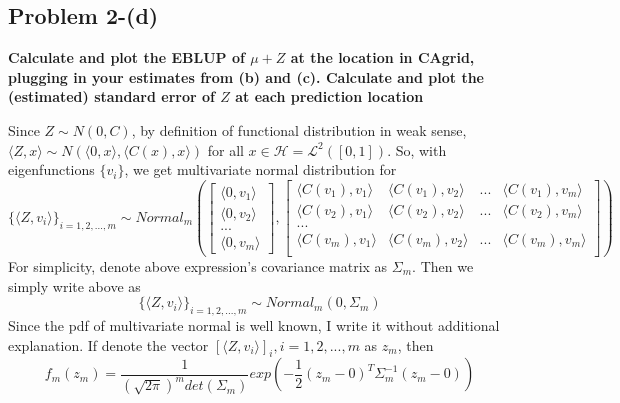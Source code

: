 \documentclass{article}
\begin{document}
\subsection{Problem 2-(d)}
\textbf{
Calculate and plot the EBLUP of $\mu+Z$ at the location in CAgrid,
plugging in your estimates from (b) and (c).
Calculate and plot the (estimated) standard error of $Z$ at each prediction location
}


Since $Z \sim N(0, C)$, by definition of functional distribution in weak sense,
\(\langle Z, x\rangle \sim N(\langle 0,x \rangle, \langle C(x),x\rangle)\) for all $x\in \mathcal{H}=\mathcal{L}^2([0,1])$.
So, with eigenfunctions $\{v_i\}$, we get multivariate normal distribution for
\[\{\langle Z, v_i\rangle\}_{i=1,2,...,m} \sim Normal_m(
\begin{bmatrix}
    \langle 0,v_1 \rangle \\
    \langle 0,v_2 \rangle \\
    ... \\
    \langle 0,v_m \rangle
\end{bmatrix}
,
\begin{bmatrix}
    \langle C(v_1),v_1 \rangle & \langle C(v_1),v_2 \rangle & ... & \langle C(v_1),v_m \rangle \\
    \langle C(v_2),v_1 \rangle & \langle C(v_2),v_2 \rangle & ... & \langle C(v_2),v_m \rangle \\
    ... \\
    \langle C(v_m),v_1 \rangle & \langle C(v_m),v_2 \rangle & ... & \langle C(v_m),v_m \rangle \\
\end{bmatrix}
)\]
For simplicity, denote above expression's covariance matrix as $\Sigma_m$. Then we simply write above as
\[\{\langle Z, v_i\rangle\}_{i=1,2,...,m} \sim Normal_m(0,\Sigma_m)\]
Since the pdf of multivariate normal is well known, I write it without additional explanation.
If denote the vector \([\langle Z, v_i\rangle]_i, i=1,2,...,m\) as $z_m$, then
\[
    f_m(z_m) = \frac{1}{(\sqrt{2\pi})^m det(\Sigma_m)}exp{(-\frac{1}{2}(z_m-0)^T\Sigma_m^{-1}(z_m-0))}
\]
\end{document}

